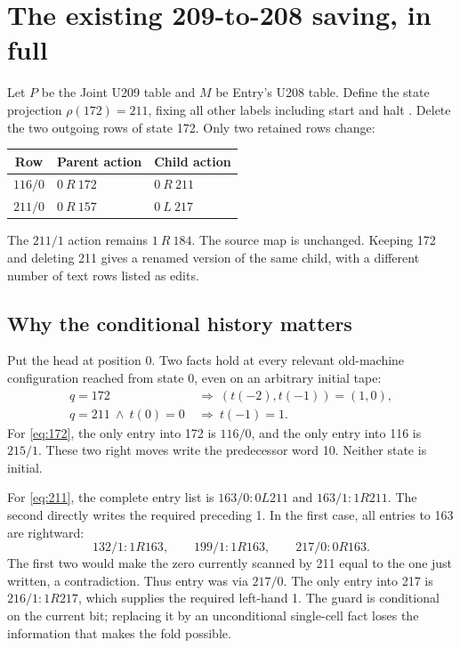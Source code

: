 \documentclass[11pt,a4paper]{article}
\begin{document}
\section{The existing 209-to-208 saving, in full}\label{sec:fold}

Let $P$ be the Joint U209 table and $M$ be Entry's U208 table. Define the
state projection $\rho(172)=211$, fixing all other labels including start
and halt \cite{earlier208}. Delete the two outgoing rows of state 172. Only two retained
rows change:

\begin{center}
\begin{tabular}{@{}cll@{}}
\toprule
Row & Parent action & Child action\\
\midrule
$116/0$ & $0\ R\ 172$ & $0\ R\ 211$\\
$211/0$ & $0\ R\ 157$ & $0\ L\ 217$\\
\bottomrule
\end{tabular}
\end{center}
The $211/1$ action remains $1\ R\ 184$. The source map is unchanged.
Keeping 172 and deleting 211 gives a renamed version of the same child,
with a different number of text rows listed as edits.

\subsection{Why the conditional history matters}

Put the head at position 0. Two facts hold at every relevant old-machine
configuration reached from state 0, even on an arbitrary initial tape:
\begin{align}
 q=172&\ \Longrightarrow\ (t(-2),t(-1))=(1,0),\label{eq:172}\\
 q=211\ \wedge\ t(0)=0&\ \Longrightarrow\ t(-1)=1.\label{eq:211}
\end{align}
For \eqref{eq:172}, the only entry into 172 is $116/0$, and the only entry
into 116 is $215/1$. These two right moves write the predecessor word 10.
Neither state is initial.

For \eqref{eq:211}, the complete entry list is $163/0:0L211$ and
$163/1:1R211$. The second directly writes the required preceding 1.
In the first case, all entries to 163 are rightward:
\[
132/1:1R163,\qquad199/1:1R163,\qquad217/0:0R163.
\]
The first two would make the zero currently scanned by 211 equal to the
one just written, a contradiction. Thus entry was via $217/0$. The only
entry into 217 is $216/1:1R217$, which supplies the required left-hand 1.
The guard is conditional on the current bit; replacing it by an
unconditional single-cell fact loses the information that makes the fold
possible.
\end{document}
